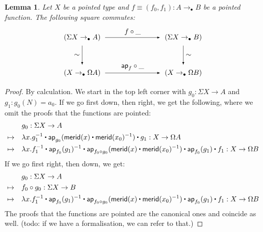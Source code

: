 \documentclass[11pt,a4paper,oneside,reqno]{amsart}
\newtheorem{lemma}[theorem]{Lemma}
\theoremstyle{definition}
\theoremstyle{remark}
\newcommand{\ct}{%
  \mathchoice{\mathbin{\raisebox{0.5ex}{$\displaystyle\centerdot$}}}%
             {\mathbin{\raisebox{0.5ex}{$\centerdot$}}}%
             {\mathbin{\raisebox{0.25ex}{$\scriptstyle\,\centerdot\,$}}}%
             {\mathbin{\raisebox{0.1ex}{$\scriptscriptstyle\,\centerdot\,$}}}
}
\newcommand{\pointedm}{\rightarrow_\bullet}
\begin{document}
\begin{lemma} \label{lem:ap-Sigma}
 Let $X$ be a pointed type and $f \equiv (f_0, f_1) : A \pointedm B$ be a pointed function.
 The following square commutes:
\begin{equation}
\begin{tikzpicture}[x=5cm,y=-1.75cm,baseline=(current bounding box.center)]
 \tikzset{arrow/.style={shorten >=0.1cm,shorten <=.1cm,-latex}}
 \node (A) at (0,0) {$(\Sigma X \pointedm A)$}; 
 \node (D) at (1,0) {$(\Sigma X \pointedm B)$}; 
 \node (B) at (0,1) {$(X \pointedm \Omega A)$}; 
 \node (C) at (1,1) {$(X \pointedm \Omega B)$}; 

 \draw[arrow] (A) to node [above] {$f \circ \_$} (D);
 \draw[arrow] (A) to node [left] {$\sim$} (B);
 \draw[arrow] (B) to node [above] {$\mathsf{ap}_f \circ \_$} (C);
 \draw[arrow] (D) to node [right] {$\sim$} (C);
\end{tikzpicture}
\end{equation}
\end{lemma}
\begin{proof}
 By calculation.
We start in the top left corner with $g_0 : \Sigma X \to A$ and $g_1 : g_0(N) = a_0$. If we go first down, then right, we get the following, where we omit the proofs that the functions are pointed:
\begin{equation}
 \begin{alignedat}{5}
  &\quad && g_0 : \Sigma X \to A & \\
  \mapsto &&& \lambda x. g_1^{-1} \ct \mathsf{ap}_{g_0}(\mathsf{merid}(x) \ct \mathsf{merid}(x_0)^{-1}) \ct g_1 : X \to \Omega A \\
  \mapsto &&& \lambda x. f_1^{-1} \ct \mathsf{ap}_{f_0}(g_1)^{-1} \ct  \mathsf{ap}_{f_0 \circ g_0}(\mathsf{merid}(x) \ct \mathsf{merid}(x_0)^{-1}) \ct \mathsf{ap}_{f_0}(g_1) \ct f_1 : X \to \Omega B
 \end{alignedat}
\end{equation}
If we go first right, then down, we get:
\begin{equation}
 \begin{alignedat}{5}
  &\quad && g_0 : \Sigma X \to A & \\
  \mapsto &&&  f_0 \circ g_0 : \Sigma X \to B \\
  \mapsto &&& \lambda x. f_1^{-1} \ct \mathsf{ap}_{f_0}(g_1)^{-1} \ct  \mathsf{ap}_{f_0 \circ g_0}(\mathsf{merid}(x) \ct \mathsf{merid}(x_0)^{-1}) \ct \mathsf{ap}_{f_0}(g_1) \ct f_1 : X \to \Omega B
 \end{alignedat}
\end{equation}
The proofs that the functions are pointed are the canonical ones and coincide as well. (todo: if we have a formalisation, we can refer to that.)
\end{proof}
\end{document}
